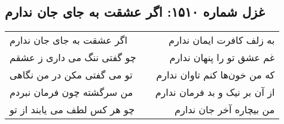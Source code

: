 \begin{center}
\section*{غزل شماره ۱۵۱۰: اگر عشقت به جای جان ندارم}
\label{sec:1510}
\begin{longtable}{l p{0.5cm} r}
اگر عشقت به جای جان ندارم
&&
به زلف کافرت ایمان ندارم
\\
چو گفتی ننگ می داری ز عشقم
&&
غم عشق تو را پنهان ندارم
\\
تو می گفتی مکن در من نگاهی
&&
که من خون‌ها کنم تاوان ندارم
\\
من سرگشته چون فرمان نبردم
&&
از آن بر نیک و بد فرمان ندارم
\\
چو هر کس لطف می یابند از تو
&&
من بیچاره آخر جان ندارم
\\
\end{longtable}
\end{center}

